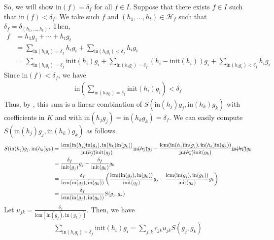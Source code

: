 \documentclass{article}
\begin{document}
\begin{pfsp}
    So, we will show $\mathrm{in}(f) = \delta_f$ for all $f \in I$. Suppose that there exists $f \in I$ such that $\mathrm{in}(f) < \delta_f$. We take such $f$ and $(h_1, \ldots, h_t) \in \mathcal{H}_f$ such that $\delta_f = \delta_{(h_1, \ldots, h_t)}$. Then, 
    \begin{align}
        f &= h_1 g_1 + \cdots + h_t g_t\\ 
        &= \sum_{\mathrm{in}(h_i g_i) = \delta_f} h_i g_i + \sum_{\mathrm{in}(h_i g_i) < \delta_f} h_i g_i\\ 
        &= \sum_{\mathrm{in}(h_i g_i) = \delta_f} \mathrm{init}(h_i) g_i + \sum_{\mathrm{in}(h_i g_i) = \delta_f} (h_i - \mathrm{init}(h_i)) g_i + \sum_{\mathrm{in}(h_i g_i) < \delta_f} h_i g_i
    \end{align}
    Since $\mathrm{in}(f) < \delta_f$, we have
    \begin{align}
        \mathrm{in} \left( \sum_{\mathrm{in}(h_i g_i) = \delta_f} \mathrm{init}(h_i) g_i \right) < \delta_f
    \end{align}
    Thus, by , this sum is a linear combination of $S(\mathrm{in}(h_j)g_j, \mathrm{in}(h_k)g_k)$ with coefficients in $K$ and with $\mathrm{in}(h_j g_j) = \mathrm{in}(h_kg_k) = \delta_f$. We can easily compute $S(\mathrm{in}(h_j)g_j, \mathrm{in}(h_k)g_k)$ as follows.
    \begin{align}
        S(\mathrm{in}(h_j)g_j, \mathrm{in}(h_k)g_k) &= \frac{\mathrm{lcm}(\mathrm{in}(h_j)\mathrm{in}(g_j), \mathrm{in}(h_k)\mathrm{in}(g_k))}{\cancel{\mathrm{in}(h_j)}\mathrm{init}(g_j)} \cancel{\mathrm{in}(h_j)} g_j - \frac{\mathrm{lcm}(\mathrm{in}(h_j)\mathrm{in}(g_j), \mathrm{in}(h_k)\mathrm{in}(g_k))}{\cancel{\mathrm{in}(h_k)}\mathrm{init}(g_k)} \cancel{\mathrm{in}(h_k)} g_k \\ 
        &= \frac{\delta_f}{\mathrm{init}(g_j)} g_j - \frac{\delta_f}{\mathrm{init}(g_k)} g_k \\
        &= \frac{\delta_f}{\mathrm{lcm}(\mathrm{in}(g_j), \mathrm{in}(g_k))} \left(\frac{\mathrm{lcm}(\mathrm{in}(g_j), \mathrm{in}(g_k))}{\mathrm{init}(g_j)} g_j - \frac{\mathrm{lcm}(\mathrm{in}(g_j), \mathrm{in}(g_k))}{\mathrm{init}(g_k)} g_k \right) \\
        &= \frac{\delta_f}{\mathrm{lcm}(\mathrm{in}(g_j), \mathrm{in}(g_k))} S(g_j, g_k)
    \end{align}
    Let $\displaystyle{u_{jk} = \frac{\delta_f}{\mathrm{lcm}(\mathrm{in}(g_j), \mathrm{in}(g_k))}}$. Then, we have
    \begin{align}
        \sum_{\mathrm{in}(h_i g_i) = \delta_f} \mathrm{init}(h_i) g_i = \sum_{j,k} c_{jk} u_{jk} S(g_j, g_k)

\end{align}
\end{pfsp}
\end{document}

